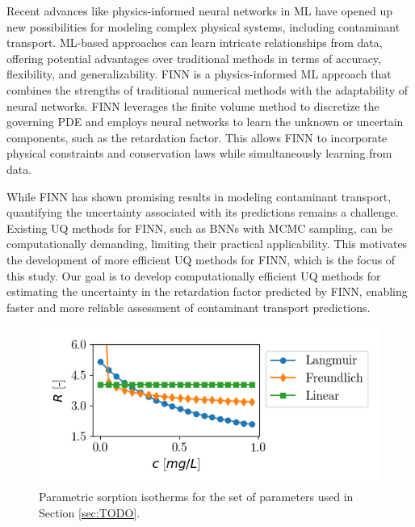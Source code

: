 Recent advances like physics-informed neural networks in ML have opened up new possibilities for modeling complex physical systems, including contaminant transport. ML-based approaches can learn intricate relationships from data, offering potential advantages over traditional methods in terms of accuracy, flexibility, and generalizability. FINN \cite{finn} is a physics-informed ML approach that combines the strengths of traditional numerical methods with the adaptability of neural networks. FINN leverages the finite volume method to discretize the governing PDE and employs neural networks to learn the unknown or uncertain components, such as the retardation factor. This allows FINN to incorporate physical constraints and conservation laws while simultaneously learning from data.

While FINN has shown promising results in modeling contaminant transport, quantifying the uncertainty associated with its predictions remains a challenge. Existing UQ methods for FINN, such as BNNs with MCMC sampling, can be computationally demanding, limiting their practical applicability. This motivates the development of more efficient UQ methods for FINN, which is the focus of this study. Our goal is to develop computationally efficient UQ methods for estimating the uncertainty in the retardation factor predicted by FINN, enabling faster and more reliable assessment of contaminant transport predictions.

\begin{figure}[h]
    \centering
    \includegraphics{figs/parametric_isotherms.png}
    \caption{Parametric sorption isotherms for the set of parameters used in Section \vref{sec:TODO}.}
    \label{fig:parametric_isotherms}
\end{figure}



